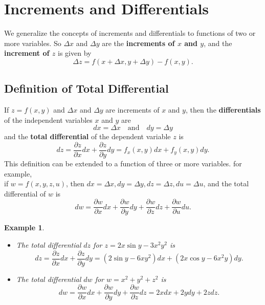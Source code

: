 \documentclass[titlepage,a4paper,12pt]{report}
\newtheorem{example}{Example}[section]
\begin{document}
\section{Increments and Differentials}
We generalize the concepts of increments and differentials to functions of two or more variables. So $\Delta x$ and $\Delta y$ are the \textbf{increments of $x$ and $y$}, and the \textbf{increment of $z$} is given by 
\[\Delta z =f(x+\Delta x, y+\Delta y)- f(x,y).\]
\subsection{Definition of Total Differential}
If $z=f(x,y)$ and $\Delta x$ and $\Delta y$ are increments of $x$ and $y$, then the \textbf{differentials} of the independent variables $x$ and $y$ are 
\[dx=\Delta x \quad \mbox{and} \quad dy=\Delta y\]
and the \textbf{total differential} of the dependent variable $z$ is 
\[dz=\dfrac{\partial z}{\partial x}dx+\dfrac{\partial z}{\partial y}dy=f_x(x,y)dx+f_y(x,y)dy.\]
This definition can be extended to a function of three or more variables. for example,\\ if $w=f(x,y,z,u)$, then $dx=\Delta x, dy=\Delta y, dz=\Delta z, du=\Delta u$, and the total differential of $w$ is 
\[dw=\dfrac{\partial w}{\partial x}dx+\dfrac{\partial w}{\partial y}dy+\dfrac{\partial w}{\partial z}dz+\dfrac{\partial w}{\partial u}du.\]
\begin{example}
\begin{itemize}
\item[(i)] The total differential $dz$ for $z=2x\sin y-3x^2y^2$ is 
\[dz=\dfrac{\partial z}{\partial x}dx+\dfrac{\partial z}{\partial y}dy =(2\sin y-6xy^2)dx+(2x\cos y-6x^2y)dy.\]
\item[(ii)] The total differential $dw$ for $w=x^2+y^2+z^2$ is 
\[dw=\dfrac{\partial w}{\partial x}dx+\dfrac{\partial w}{\partial y}dy+\dfrac{\partial w}{\partial z}dz=2xdx+2ydy+2zdz.\]
\end{itemize}
\end{example}
\end{document}

